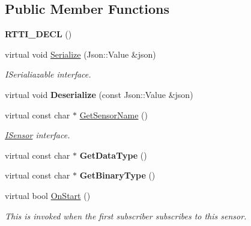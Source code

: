 \subsection*{Public Member Functions}
\begin{DoxyCompactItemize}
\item 
\mbox{\label{class_camera_abee8bc9a9c1ebee8a809b2fb8e436950}} 
{\bfseries R\+T\+T\+I\+\_\+\+D\+E\+CL} ()
\item 
\mbox{\label{class_camera_a5b70be7fddf2ccf074890a7e7b369188}} 
virtual void \hyperlink{class_camera_a5b70be7fddf2ccf074890a7e7b369188}{Serialize} (Json\+::\+Value \&json)
\begin{DoxyCompactList}\small\item\em I\+Serialiazable interface. \end{DoxyCompactList}\item 
\mbox{\label{class_camera_a82ec2a9bb8493f2c4bbdb97cd79dfd94}} 
virtual void {\bfseries Deserialize} (const Json\+::\+Value \&json)
\item 
\mbox{\label{class_camera_a982c2ab097483c212e1267485848819d}} 
virtual const char $\ast$ \hyperlink{class_camera_a982c2ab097483c212e1267485848819d}{Get\+Sensor\+Name} ()
\begin{DoxyCompactList}\small\item\em \hyperlink{class_i_sensor}{I\+Sensor} interface. \end{DoxyCompactList}\item 
\mbox{\label{class_camera_a0601adae3ffbef3152cab59d423fc678}} 
virtual const char $\ast$ {\bfseries Get\+Data\+Type} ()
\item 
\mbox{\label{class_camera_a10d9f7d28581f448474b65ca9755caa3}} 
virtual const char $\ast$ {\bfseries Get\+Binary\+Type} ()
\item 
\mbox{\label{class_camera_a7ca83b9c76148375de7f2c38c7443824}} 
virtual bool \hyperlink{class_camera_a7ca83b9c76148375de7f2c38c7443824}{On\+Start} ()
\begin{DoxyCompactList}\small\item\em This is invoked when the first subscriber subscribes to this sensor. \end{DoxyCompactList}\item 

\end{DoxyCompactItemize}
